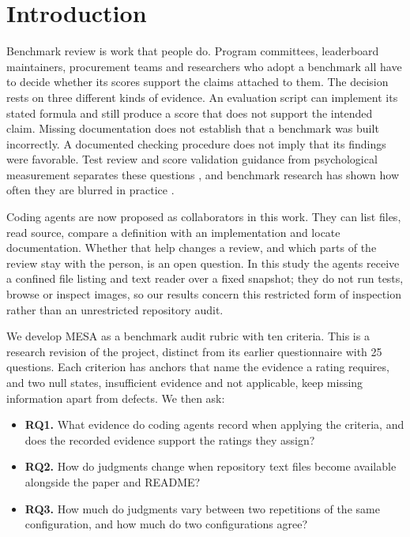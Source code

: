 \documentclass[10pt,conference]{IEEEtran}
\begin{document}
\section{Introduction}
Benchmark review is work that people do. Program committees, leaderboard maintainers, procurement teams and researchers who adopt a benchmark all have to decide whether its scores support the claims attached to them. The decision rests on three different kinds of evidence. An evaluation script can implement its stated formula and still produce a score that does not support the intended claim. Missing documentation does not establish that a benchmark was built incorrectly. A documented checking procedure does not imply that its findings were favorable. Test review and score validation guidance from psychological measurement separates these questions \cite{efpa_test_review_model_2025,kane_validation,aera_apa_ncme_standards_2014}, and benchmark research has shown how often they are blurred in practice \cite{reuel_betterbench,bean_measuring_what_matters,jo_wilson_what_does_your_benchmark_measure}.

Coding agents are now proposed as collaborators in this work. They can list files, read source, compare a definition with an implementation and locate documentation. Whether that help changes a review, and which parts of the review stay with the person, is an open question. In this study the agents receive a confined file listing and text reader over a fixed snapshot; they do not run tests, browse or inspect images, so our results concern this restricted form of inspection rather than an unrestricted repository audit.

We develop MESA as a benchmark audit rubric with ten criteria. This is a research revision of the project, distinct from its earlier questionnaire with 25 questions. Each criterion has anchors that name the evidence a rating requires, and two null states, insufficient evidence and not applicable, keep missing information apart from defects. We then ask:

\begin{itemize}
\item \textbf{RQ1.} What evidence do coding agents record when applying the criteria, and does the recorded evidence support the ratings they assign?
\item \textbf{RQ2.} How do judgments change when repository text files become available alongside the paper and README?
\item \textbf{RQ3.} How much do judgments vary between two repetitions of the same configuration, and how much do two configurations agree?
\end{itemize}
\end{document}
